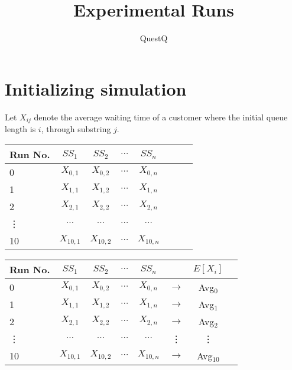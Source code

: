 \documentclass{article}
\begin{document}
\pagecolor{ultramarine}
\title{Experimental Runs}
\author{QuestQ}
\date{}
\maketitle
\section*{Initializing simulation}

Let $X_{ij}$ denote the average waiting time of a customer where the initial queue length is $i$, through substring $j$. \newline
\begin{tabular}{l*{6}{c}r}
Run No.  & $SS_1$ & $SS_2$ & $\cdots$ & $SS_n$   \\
\hline
0 & $X_{0,1}$ & $X_{0,2}$ & $\cdots$ & $X_{0,n}$   \\
1 & $X_{1,1}$ & $X_{1,2}$ & $\cdots$ & $X_{1,n}$   \\
2 & $X_{2,1}$ & $X_{2,2}$ & $\cdots$ & $X_{2,n}$   \\
\vdots & $\cdots$ & $\cdots$ & $\cdots$ & $\cdots$   \\
10 & $X_{10,1}$ & $X_{10,2}$ & $\cdots$ & $X_{10,n}$   \\
\end{tabular}
\newline
\newline
\newline

\begin{tabular}{l*{6}{c}r}
Run No.  & $SS_1$ & $SS_2$ & $\cdots$ & $SS_n$ &    &  $E[X_{i}]$ \\
\hline
0 & $X_{0,1}$ & $X_{0,2}$ & $\cdots$ & $X_{0,n}$ & $\rightarrow$   & Avg$_0$ \\
1 & $X_{1,1}$ & $X_{1,2}$ & $\cdots$ & $X_{1,n}$ & $\rightarrow$   & Avg$_1$  \\
2 & $X_{2,1}$ & $X_{2,2}$ & $\cdots$ & $X_{2,n}$ & $\rightarrow$   & Avg$_2$  \\
\vdots & $\cdots$ & $\cdots$ & $\cdots$ & $\cdots$ & \vdots   & \vdots  \\
10 & $X_{10,1}$ & $X_{10,2}$ & $\cdots$ & $X_{10,n}$ & $\rightarrow$   & Avg$_10$  \\
\end{tabular}
\end{document}
